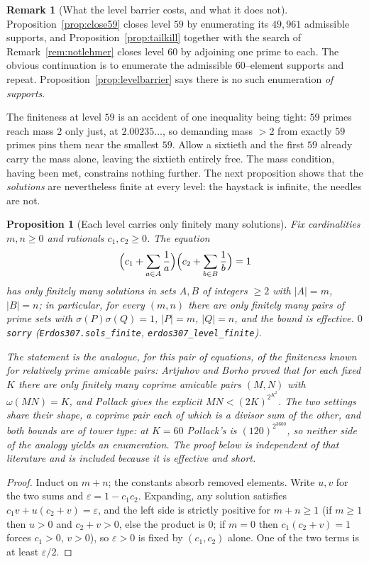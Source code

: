 \documentclass[11pt]{article}
\newtheorem{proposition}[theorem]{Proposition}
\theoremstyle{definition}
\newtheorem{remark}[theorem]{Remark}
\begin{document}
\begin{remark}[What the level barrier costs, and what it does not]\label{rem:levelbarrier}
Proposition~\ref{prop:close59} closes level $59$ by enumerating its $49{,}961$ admissible supports,
and Proposition~\ref{prop:tailkill} together with the search of Remark~\ref{rem:notlehmer} closes
level $60$ by adjoining one prime to each. The obvious continuation is to enumerate the admissible
$60$--element supports and repeat. Proposition~\ref{prop:levelbarrier} says there is no such
enumeration \emph{of supports}.

The finiteness at level $59$ is an accident of one inequality being tight: $59$ primes reach mass $2$
only just, at $2.00235\ldots$, so demanding mass $>2$ from exactly $59$ primes pins them near the
smallest $59$. Allow a sixtieth and the first $59$ already carry the mass alone, leaving the sixtieth
entirely free. The mass condition, having been met, constrains nothing further. The next proposition
shows that the \emph{solutions} are nevertheless finite at every level: the haystack is infinite, the
needles are not.

\begin{proposition}[Each level carries only finitely many solutions]\label{prop:levelfinite}
Fix cardinalities $m,n\ge0$ and rationals $c_1,c_2\ge0$. The equation
\[ \Bigl(c_1+\sum_{a\in A}\frac1a\Bigr)\Bigl(c_2+\sum_{b\in B}\frac1b\Bigr)=1 \]
has only finitely many solutions in sets $A,B$ of integers $\ge2$ with $|A|=m$, $|B|=n$; in
particular, for every $(m,n)$ there are only finitely many pairs of prime sets with
$\sigma(P)\sigma(Q)=1$, $|P|=m$, $|Q|=n$, and the bound is effective. $0$ \texttt{sorry}
\textup{(\texttt{Erdos307.sols\_finite}, \texttt{erdos307\_level\_finite})}.

The statement is the analogue, for this pair of equations, of the finiteness known for relatively
prime amicable pairs: Artjuhov and Borho proved that for each fixed $K$ there are only finitely many
coprime amicable pairs $(M,N)$ with $\omega(MN)=K$, and Pollack \cite{Pollack2018} gives the
explicit $MN<(2K)^{2^{K^2}}$. The two settings share their shape, a coprime pair each of which is a
divisor sum of the other, and both bounds are of tower type: at $K=60$ Pollack's is
$(120)^{2^{3600}}$, so neither side of the analogy yields an enumeration. The proof below is
independent of that literature and is included because it is effective and short.
\end{proposition}
\begin{proof}
Induct on $m+n$; the constants absorb removed elements. Write $u,v$ for the two sums and
$\varepsilon=1-c_1c_2$. Expanding, any solution satisfies $c_1v+u(c_2+v)=\varepsilon$, and the left
side is strictly positive for $m+n\ge1$ (if $m\ge1$ then $u>0$ and $c_2+v>0$, else the product is
$0$; if $m=0$ then $c_1(c_2+v)=1$ forces $c_1>0$, $v>0$), so $\varepsilon>0$ is fixed by
$(c_1,c_2)$ alone. One of the two terms is at least $\varepsilon/2$.


\end{proof}
\end{remark}
\end{document}
